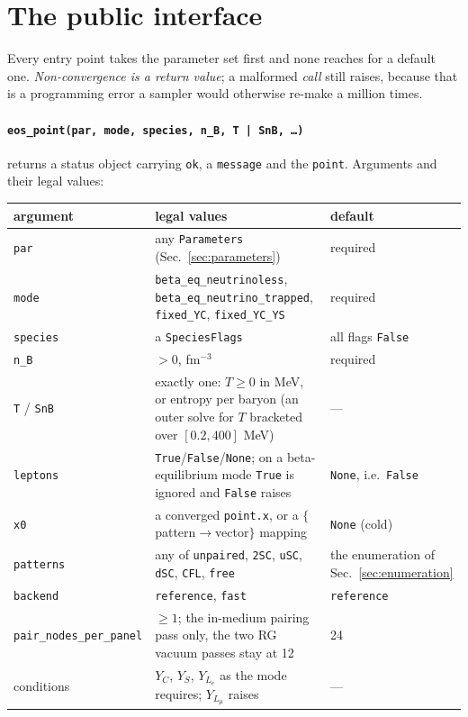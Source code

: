 \documentclass[aps,prc,onecolumn,superscriptaddress,nofootinbib,10pt]{revtex4-2}
\begin{document}
\section{The public interface}
\label{sec:api}

Every entry point takes the parameter set first and none reaches for a default
one. \emph{Non-convergence is a return value}; a malformed \emph{call} still
raises, because that is a programming error a sampler would otherwise re-make a
million times.

\paragraph{\texttt{eos\_point(par, mode, species, n\_B, T | SnB, \dots)}}
returns a status object carrying \texttt{ok}, a \texttt{message} and the
\texttt{point}. Arguments and their legal values:

\begin{center}
\footnotesize
\begin{tabular}{p{}p{}p{}}
\toprule
argument & legal values & default \\
\midrule
\texttt{par} & any \texttt{Parameters} (Sec.~\ref{sec:parameters}) & required \\
\texttt{mode} & \texttt{beta\_eq\_neutrinoless},
  \texttt{beta\_eq\_neutrino\_trapped}, \texttt{fixed\_YC},
  \texttt{fixed\_YC\_YS} & required \\
\texttt{species} & a \texttt{SpeciesFlags} & all flags \texttt{False} \\
\texttt{n\_B} & $>0$, fm$^{-3}$ & required \\
\texttt{T} / \texttt{SnB} & exactly one: $T \ge 0$ in MeV, or entropy per
  baryon (an outer solve for $T$ bracketed over $[0.2,400]$ MeV) & --- \\
\texttt{leptons} & \texttt{True}/\texttt{False}/\texttt{None}; on a
  beta-equilibrium mode \texttt{True} is ignored and \texttt{False} raises &
  \texttt{None}, i.e.\ \texttt{False} \\
\texttt{x0} & a converged \texttt{point.x}, or a $\{$pattern$\to$vector$\}$
  mapping & \texttt{None} (cold) \\
\texttt{patterns} & any of \texttt{unpaired}, \texttt{2SC}, \texttt{uSC},
  \texttt{dSC}, \texttt{CFL}, \texttt{free} &
  the enumeration of Sec.~\ref{sec:enumeration} \\
\texttt{backend} & \texttt{reference}, \texttt{fast} & \texttt{reference} \\
\texttt{pair\_nodes\_per\_panel} & $\ge 1$; the in-medium pairing pass only,
  the two RG vacuum passes stay at 12 & 24 \\
conditions & $Y_C$, $Y_S$, $Y_{L_e}$ as the mode requires; $Y_{L_\mu}$ raises
  & --- \\
\bottomrule
\end{tabular}
\end{center}
\end{document}
